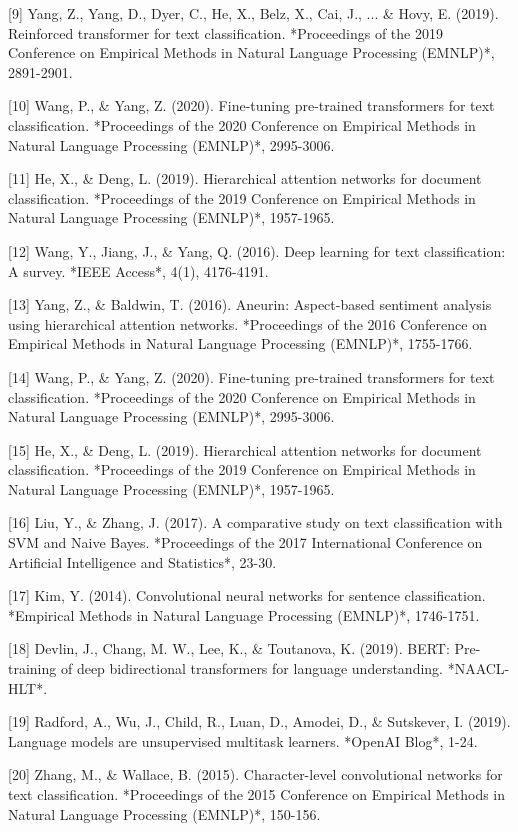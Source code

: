 [9] Yang, Z., Yang, D., Dyer, C., He, X., Belz, X., Cai, J., ... & Hovy, E. (2019). Reinforced transformer for text classification. *Proceedings of the 2019 Conference on Empirical Methods in Natural Language Processing (EMNLP)*, 2891-2901.

[10] Wang, P., & Yang, Z. (2020). Fine-tuning pre-trained transformers for text classification. *Proceedings of the 2020 Conference on Empirical Methods in Natural Language Processing (EMNLP)*, 2995-3006.

[11] He, X., & Deng, L. (2019). Hierarchical attention networks for document classification. *Proceedings of the 2019 Conference on Empirical Methods in Natural Language Processing (EMNLP)*, 1957-1965.

[12] Wang, Y., Jiang, J., & Yang, Q. (2016). Deep learning for text classification: A survey. *IEEE Access*, 4(1), 4176-4191.

[13] Yang, Z., & Baldwin, T. (2016). Aneurin: Aspect-based sentiment analysis using hierarchical attention networks. *Proceedings of the 2016 Conference on Empirical Methods in Natural Language Processing (EMNLP)*, 1755-1766.

[14] Wang, P., & Yang, Z. (2020). Fine-tuning pre-trained transformers for text classification. *Proceedings of the 2020 Conference on Empirical Methods in Natural Language Processing (EMNLP)*, 2995-3006.

[15] He, X., & Deng, L. (2019). Hierarchical attention networks for document classification. *Proceedings of the 2019 Conference on Empirical Methods in Natural Language Processing (EMNLP)*, 1957-1965.

[16] Liu, Y., & Zhang, J. (2017). A comparative study on text classification with SVM and Naive Bayes. *Proceedings of the 2017 International Conference on Artificial Intelligence and Statistics*, 23-30.

[17] Kim, Y. (2014). Convolutional neural networks for sentence classification. *Empirical Methods in Natural Language Processing (EMNLP)*, 1746-1751.

[18] Devlin, J., Chang, M. W., Lee, K., & Toutanova, K. (2019). BERT: Pre-training of deep bidirectional transformers for language understanding. *NAACL-HLT*.

[19] Radford, A., Wu, J., Child, R., Luan, D., Amodei, D., & Sutskever, I. (2019). Language models are unsupervised multitask learners. *OpenAI Blog*, 1-24.

[20] Zhang, M., & Wallace, B. (2015). Character-level convolutional networks for text classification. *Proceedings of the 2015 Conference on Empirical Methods in Natural Language Processing (EMNLP)*, 150-156.

